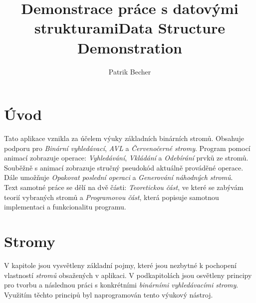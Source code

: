 \documentclass[
  biblatex=false,
  font=serif,
  glossaries=false,
  tables=false,
  theorems=false,
  index
]{kidiplom}
\title{Demonstrace práce s datovými strukturami}
\title[english]{Data Structure Demonstration}
\author{Patrik Becher}
\begin{document}


\maketitle





\section{Úvod}
\indent\indent Tato aplikace vznikla za účelem výuky základních binárních stromů. Obsahuje podporu pro \textit{Binární vyhledávací}, \textit{AVL} a \textit{Červenočerné stromy}. Program pomocí animací zobrazuje operace: \textit{Vyhledávání}, \textit{Vkládání} a \textit{Odebírání} prvků ze stromů. Souběžně s animací zobrazuje stručný pseudokód aktuálně prováděné operace. Dále umožňuje \textit{Opakovat poslední operaci} a \textit{Generování náhodných stromů}.\\
\indent Text samotné práce se dělí na dvě části: \textit{Teoretickou část}, ve které se zabývám teorií vybraných stromů a \textit{Programovou část}, která popisuje samotnou implementaci a funkcionalitu programu.\\

\newpage
\section{Stromy}
\indent \indent V kapitole jsou vysvětleny základní pojmy, které jsou nezbytné k pochopení vlastností \textit{stromů} obsažených v aplikaci. V podkapitolách jsou osvětleny principy pro tvorbu a následnou práci s konkrétními \textit{binárními vyhledávacími stromy}. Využitím těchto principů byl naprogramován tento výukový nástroj.\\
\end{document}
